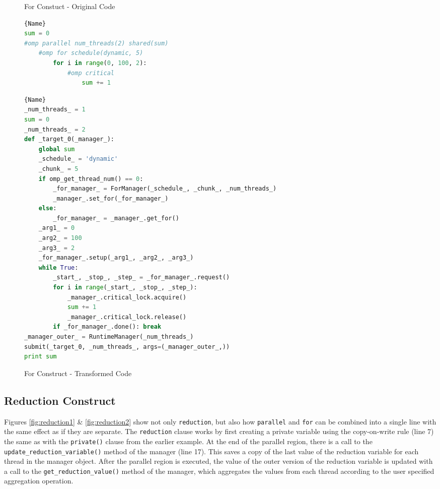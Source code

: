 \documentclass[letterpaper,12pt]{article} %
\begin{document}
\begin{figure}[H]
\caption{For Constuct - Original Code}
\label{fig:for1}
\begin{lstlisting}[language=Python]{Name}
sum = 0
#omp parallel num_threads(2) shared(sum)
    #omp for schedule(dynamic, 5)
        for i in range(0, 100, 2):
            #omp critical
                sum += 1
\end{lstlisting}


\caption{For Construct - Transformed Code}
\label{fig:for2}
\begin{lstlisting}[language=Python]{Name}
_num_threads_ = 1
sum = 0
_num_threads_ = 2
def _target_0(_manager_):
    global sum
    _schedule_ = 'dynamic'
    _chunk_ = 5
    if omp_get_thread_num() == 0:
        _for_manager_ = ForManager(_schedule_, _chunk_, _num_threads_)
        _manager_.set_for(_for_manager_)
    else:
        _for_manager_ = _manager_.get_for()
    _arg1_ = 0
    _arg2_ = 100
    _arg3_ = 2
    _for_manager_.setup(_arg1_, _arg2_, _arg3_)
    while True:
        _start_, _stop_, _step_ = _for_manager_.request()
        for i in range(_start_, _stop_, _step_):
            _manager_.critical_lock.acquire()
            sum += 1
            _manager_.critical_lock.release()
        if _for_manager_.done(): break
_manager_outer_ = RuntimeManager(_num_threads_)
submit(_target_0, _num_threads_, args=(_manager_outer_,))
print sum
\end{lstlisting}
\end{figure}


\subsection{Reduction Construct}
Figures \ref{fig:reduction1} \& \ref{fig:reduction2} show not only \texttt{reduction}, but also how \texttt{parallel} and \texttt{for} can be combined into a single line with the same effect as if they are separate. The \texttt{reduction} clause works by first creating a private variable using the copy-on-write rule (line 7) the same as with the \texttt{private()} clause from the earlier example.  At the end of the parallel region, there is a call to the \texttt{update\_reduction\_variable()} method of the manager (line 17). This saves a copy of the last value of the reduction variable for each thread in the manager object. After the parallel region is executed, the value of the outer version of the reduction variable is updated with a call to the \texttt{get\_reduction\_value()} method of the manager, which aggregates the values from each thread according to the user specified aggregation operation. 
\end{document}
